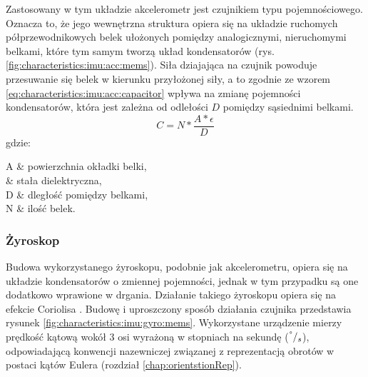 Zastosowany w tym układzie akcelerometr jest czujnikiem typu pojemnościowego. Oznacza to, że jego wewnętrzna struktura opiera się na układzie ruchomych półprzewodnikowych belek ułożonych pomiędzy analogicznymi, nieruchomymi belkami, które tym samym tworzą układ kondensatorów (rys. \ref{fig:characteristics:imu:acc:mems}). Siła dziajająca na czujnik powoduje przesuwanie się belek w kierunku przyłożonej siły, a to zgodnie ze wzorem \eqref{eq:characteristics:imu:acc:capacitor} wpływa na zmianę pojemności kondensatorów, która jest zależna od odlełości $D$ pomiędzy sąsiednimi belkami.
\begin{equation}
C = N * \frac{A * \epsilon}{D}
\label{eq:characteristics:imu:acc:capacitor}
\end{equation}
gdzie:
\begin{conditions}
A & powierzchnia okładki belki,\\
\epsilon			& stała dielektryczna,\\
D			& dległość pomiędzy belkami,\\
N	& ilość belek.\\
\end{conditions}

\subsubsection*{Żyroskop}
Budowa wykorzystanego żyroskopu, podobnie jak akcelerometru, opiera się na układzie kondensatorów o zmiennej pojemności, jednak w tym przypadku są one dodatkowo wprawione w drgania. Działanie takiego żyroskopu opiera się na efekcie Coriolisa \cite{memsAccIdea2016}. Budowę i uproszczony sposób działania czujnika przedstawia rysunek \ref{fig:characteristics:imu:gyro:mems}. Wykorzystane urządzenie mierzy prędkość kątową wokół 3 osi wyrażoną w stopniach na sekundę ($^\degree/_s$), odpowiadającą konwencji nazewniczej związanej z reprezentacją obrotów w postaci kątów Eulera (rozdział \ref{chap:orientstionRep}). 

